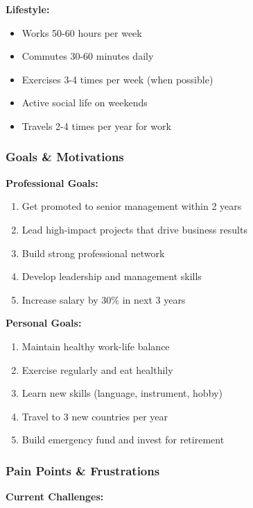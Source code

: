 \textbf{Lifestyle:}
\begin{itemize}
    \item Works 50-60 hours per week
    \item Commutes 30-60 minutes daily
    \item Exercises 3-4 times per week (when possible)
    \item Active social life on weekends
    \item Travels 2-4 times per year for work
\end{itemize}

\subsubsection{Goals \& Motivations}

\textbf{Professional Goals:}
\begin{enumerate}
    \item Get promoted to senior management within 2 years
    \item Lead high-impact projects that drive business results
    \item Build strong professional network
    \item Develop leadership and management skills
    \item Increase salary by 30\% in next 3 years
\end{enumerate}

\textbf{Personal Goals:}
\begin{enumerate}
    \item Maintain healthy work-life balance
    \item Exercise regularly and eat healthily
    \item Learn new skills (language, instrument, hobby)
    \item Travel to 3 new countries per year
    \item Build emergency fund and invest for retirement
\end{enumerate}

\subsubsection{Pain Points \& Frustrations}

\textbf{Current Challenges:}

